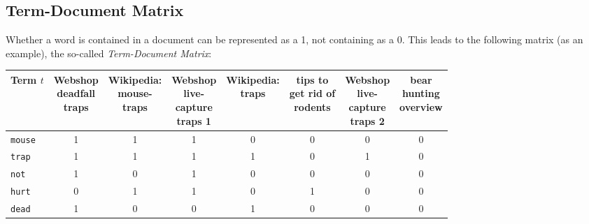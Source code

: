 \documentclass[a4paper, 11pt, accentcolor = tud3b]{tudreport}
\begin{document}
            \subsection{Term-Document Matrix} %
            	Whether a word is contained in a document can be represented as a 1, not containing as a 0. This leads to the following matrix (as an example), the so-called \textit{Term-Document Matrix}:
            	\begin{table}[H]
            		\centering
            		\begin{tabular}{|l|c|c|c|c|c|c|c|}
            			\hline
            			\textbf{Term} \(t\) & \makecell{Webshop \\ deadfall \\ traps} & \makecell{Wikipedia: \\ mouse- \\ traps} & \makecell{Webshop \\ live- \\ capture \\ traps 1} & \makecell{Wikipedia: \\ traps} & \makecell{tips to \\ get rid of \\ rodents} & \makecell{Webshop \\ live- \\ capture \\ traps 2} & \makecell{bear \\ hunting \\ overview} \\ \hline
            			\texttt{mouse}  &         1          &         1          &         1          & \textcolor{irl}{0} & \textcolor{irl}{0} & \textcolor{irl}{0} & \textcolor{irl}{0} \\ \hline
            			\texttt{trap}   &         1          &         1          &         1          &         1          & \textcolor{irl}{0} &         1          & \textcolor{irl}{0} \\ \hline
            			\texttt{not}    &         1          & \textcolor{irl}{0} &         1          & \textcolor{irl}{0} & \textcolor{irl}{0} & \textcolor{irl}{0} & \textcolor{irl}{0} \\ \hline
            			\texttt{hurt}   & \textcolor{irl}{0} &         1          &         1          & \textcolor{irl}{0} &         1          & \textcolor{irl}{0} & \textcolor{irl}{0} \\ \hline
            			\texttt{dead}   &         1          & \textcolor{irl}{0} & \textcolor{irl}{0} &         1          & \textcolor{irl}{0} & \textcolor{irl}{0} & \textcolor{irl}{0} \\ \hline

\end{tabular}
\end{table}
\end{document}
